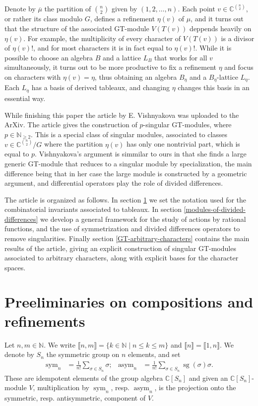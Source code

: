 \documentclass[11pt,fleqn]{article}
\newcommand\NN{\mathbb N}
\newcommand\CC{\mathbb C}
\newcommand\interval[1]{\llbracket #1 \rrbracket}
\DeclareMathOperator\sym{sym}
\DeclareMathOperator\asym{asym}
\DeclareMathOperator\sg{sg}
\begin{document}
Denote by $\overline \mu$ the partition of $\binom{n}{2}$ given by 
$(1,2,\ldots, n)$. Each point $v \in \CC^{\binom{n}{2}}$, or rather its class 
modulo $G$, defines a refinement $\eta(v)$ of $\mu$, and it turns out that the 
structure of the associated GT-module $V(T(v))$ deppends heavily on $\eta(v)$. 
For example, the multiplicity of every character of $V(T(v))$ is a divisor of 
$\eta(v)!$, and for most characters it is in fact equal to $\eta(v)!$. While 
it is possible to choose an algebra $B$ and a lattice $L_B$ that works for all 
$v$ simultaneously, it turns out to be more productive to fix a refinement 
$\eta$ and focus on characters with $\eta(v) = \eta$, thus obtaining an algebra
$B_\eta$ and a $B_\eta$-lattice $L_\eta$. Each $L_\eta$ has a basis of derived
tableaux, and changing $\eta$ changes this basis in an essential way.

While finishing this paper the article \cite{V-geometric-singular-GT} by 
E. Vishnyakova was uploaded to the ArXiv. The article gives the construction 
of $p$-singular GT-modules, where $p \in \NN_{\geq 2}$. This is a special 
class of singular modules, associated to classes $v \in \CC^{\binom{n}{2}}
/G$ where the partition $\eta(v)$ has only one nontrivial part, which is equal 
to $p$. Vishnyakova's argument is simmilar to ours in that she finds a large 
generic GT-module that reduces to a singular module by specialization, the 
main difference being that in her case the large module is constructed by a 
geometric argument, and differential operators play the role of divided 
differences. 

\bigskip

The article is organized as follows. In section \ref{preeliminaries} we 
set the notation used for the combinatorial invariants associated to tableaux.
In section \ref{modules-of-divided-differences} we develop a general framework 
for the study of actions by rational functions, and the use of symmetrization 
and divided differences operators to remove singularities. Finally section 
\ref{GT-arbitrary-characters} contains the main results of the article, giving
an explicit construction of singular GT-modules associated to arbitrary 
characters, along with explicit bases for the character spaces. 

\section{Preeliminaries on compositions and refinements}
\label{preeliminaries}
Let $n,m \in \NN$. We write $\interval{n,m} = \{k \in \NN \mid n \leq k \leq 
m\}$ and $\interval{n} = \interval{1,n}$. We denote by $S_n$ the symmetric 
group on $n$ elements, and set
\begin{align*}
\sym_n 
  &= \frac{1}{n!}\sum_{\sigma \in S_n} \sigma;
&\asym_n
  &= \frac{1}{n!} \sum_{\sigma \in S_n} \sg(\sigma) \sigma.
\end{align*}
These are idempotent elements of the group algebra $\CC[S_n]$ and given an 
$\CC[S_n]$-module $V$, multiplication by $\sym_n$, resp. $\asym_n$, is the 
projection onto the symmetric, resp. antisymmetric, component of $V$. 
\end{document}
